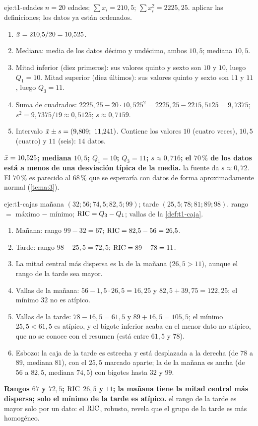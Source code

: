\begin{solucion}{eje:t1-edades}
\datos $n=20$ edades; $\sum x_i=210{,}5$; $\sum x_i^{2}=2225{,}25$.
\planteamiento aplicar las definiciones; los datos ya están ordenados.
\pasos
\begin{enumerate}[label=\arabic*.]
  \item $\bar{x}=210{,}5/20=10{,}525$.
  \item Mediana: media de los datos décimo y undécimo, ambos $10{,}5$; mediana $10{,}5$.
  \item Mitad inferior (diez primeros): sus valores quinto y sexto son $10$ y $10$, luego $Q_1=10$. Mitad superior (diez últimos): sus valores quinto y sexto son $11$ y $11$, luego $Q_3=11$.
  \item Suma de cuadrados: $2225{,}25-20\cdot10{,}525^{2}=2225{,}25-2215{,}5125=9{,}7375$; $s^{2}=9{,}7375/19\approx0{,}5125$; $s\approx0{,}7159$.
  \item Intervalo $\bar{x}\pm s=(9{,}809;\allowbreak\ 11{,}241)$. Contiene los valores $10$ (cuatro veces), $10{,}5$ (cuatro) y $11$ (seis): $14$ datos.
\end{enumerate}
\resultado \textbf{$\bar{x}=10{,}525$; mediana $10{,}5$; $Q_1=10$; $Q_3=11$; $s\approx0{,}716$; el $70\,\%$ de los datos está a menos de una desviación típica de la media.}
\comprobacion la fuente da $s\approx0{,}72$. El $70\,\%$ es parecido al $68\,\%$ que se esperaría con datos de forma aproximadamente normal (\cref{tema:3}).
\end{solucion}

\begin{solucion}{eje:t1-cajas}
\datos mañana $(32;56;74{,}5;82{,}5;99)$; tarde $(25{,}5;78;81;89;98)$.
\planteamiento rango $=$ máximo $-$ mínimo; $\operatorname{RIC}=Q_3-Q_1$; vallas de la \cref{def:t1-caja}.
\pasos
\begin{enumerate}[label=\arabic*.]
  \item Mañana: rango $99-32=67$; $\operatorname{RIC}=82{,}5-56=26{,}5$.
  \item Tarde: rango $98-25{,}5=72{,}5$; $\operatorname{RIC}=89-78=11$.
  \item La mitad central más dispersa es la de la mañana ($26{,}5>11$), aunque el rango de la tarde sea mayor.
  \item Vallas de la mañana: $56-1{,}5\cdot26{,}5=16{,}25$ y $82{,}5+39{,}75=122{,}25$; el mínimo $32$ no es atípico.
  \item Vallas de la tarde: $78-16{,}5=61{,}5$ y $89+16{,}5=105{,}5$; el mínimo $25{,}5<61{,}5$ es atípico, y el bigote inferior acaba en el menor dato no atípico, que no se conoce con el resumen (está entre $61{,}5$ y $78$).
  \item Esbozo: la caja de la tarde es estrecha y está desplazada a la derecha (de $78$ a $89$, mediana $81$), con el $25{,}5$ marcado aparte; la de la mañana es ancha (de $56$ a $82{,}5$, mediana $74{,}5$) con bigotes hasta $32$ y $99$.
\end{enumerate}
\resultado \textbf{Rangos $67$ y $72{,}5$; $\operatorname{RIC}$ $26{,}5$ y $11$; la mañana tiene la mitad central más dispersa; solo el mínimo de la tarde es atípico.}
\comprobacion el rango de la tarde es mayor solo por un dato: el $\operatorname{RIC}$, robusto, revela que el grupo de la tarde es más homogéneo.
\end{solucion}

